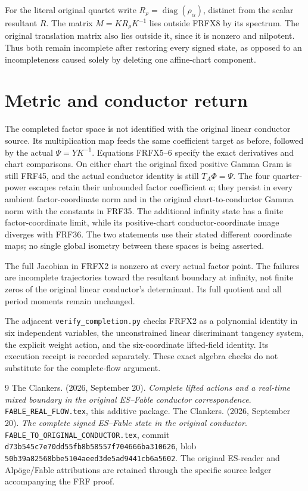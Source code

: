 \documentclass[11pt]{article}
\newcommand{\diag}{\operatorname{diag}}
\begin{document}
For the literal original quartet write $R_\rho=\diag(\rho_\alpha)$,
distinct from the scalar resultant $R$. The matrix $M=KR_\rho K^{-1}$
lies outside FRFX8 by its spectrum. The original translation matrix
also lies outside it, since it is nonzero and nilpotent. Thus both
remain incomplete after restoring every signed state, as opposed to
an incompleteness caused solely by deleting one affine-chart component.

\section{Metric and conductor return}
The completed factor space is not identified with the original linear
conductor source. Its multiplication map feeds the same coefficient
target as before, followed by the actual $\Psi=YK^{-1}$. Equations
FRFX5--6 specify the exact derivatives and chart comparisons. On either
chart the original fixed positive Gamma Gram is still FRF45, and the
actual conductor identity is still $T_A\Phi=\Psi$. The four
quarter-power escapes retain their unbounded factor coefficient $a$;
they persist in every ambient factor-coordinate norm and in the
original chart-to-conductor Gamma norm with the constants in FRF35.
The additional infinity state has a finite factor-coordinate limit,
while its positive-chart conductor-coordinate image diverges with
FRF36. The two statements use their stated different coordinate maps;
no single global isometry between these spaces is being asserted.

The full Jacobian in FRFX2 is nonzero at every actual factor point.
The failures are incomplete trajectories toward the resultant boundary
at infinity, not finite zeros of the original linear conductor's
determinant. Its full quotient and all period moments remain unchanged.

The adjacent \texttt{verify\_completion.py} checks FRFX2 as a polynomial
identity in six independent variables, the unconstrained linear
discriminant tangency system, the explicit weight action, and the
six-coordinate lifted-field identity. Its execution receipt is recorded
separately. These exact algebra checks do not substitute for the
complete-flow argument.

\begin{thebibliography}{9}
 The Clankers. (2026, September 20).
\emph{Complete lifted actions and a real-time mixed boundary in the
original ES--Fable conductor correspondence}.
\texttt{FABLE\_REAL\_FLOW.tex}, this additive package.
 The Clankers. (2026, September 20).
\emph{The complete signed ES--Fable state in the original conductor}.
\texttt{FABLE\_TO\_ORIGINAL\_CONDUCTOR.tex}, commit
\texttt{d73b545c7e70dd55fb8b58557f704666ba310626},
blob \texttt{50b39a82568bbe5104aeed3de5ad9441cb6a5602}.
The original ES-reader and Alp\"oge/Fable attributions are retained
through the specific source ledger accompanying the FRF proof.
\end{thebibliography}
\end{document}
